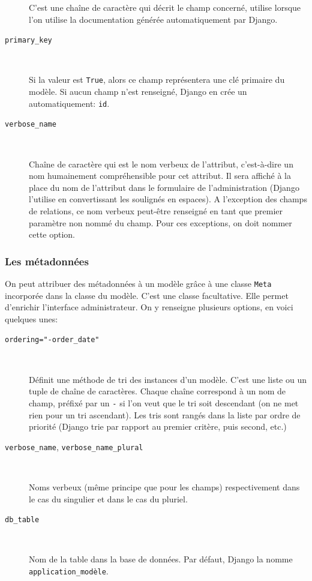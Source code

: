 \documentclass[a4paper, 10pt]{article}
\begin{document}
\begin{description}
          C'est une chaîne de caractère qui décrit le champ concerné, utilise lorsque l'on utilise la documentation générée automatiquement par Django.

    \item[\texttt{primary_key}]~

          Si la valeur est \texttt{True}, alors ce champ représentera une clé primaire du modèle. Si aucun champ n'est renseigné, Django en crée un automatiquement: \texttt{id}.

    \item[\texttt{verbose_name}]~

          Chaîne de caractère qui est le \og nom verbeux \fg{} de l'attribut, c'est-à-dire un nom humainement compréhensible pour cet attribut. Il sera affiché à la place du nom de l'attribut dans le formulaire de l'administration (Django l'utilise en convertissant les soulignés en espaces). A l'exception des champs de relations, ce nom verbeux peut-être renseigné en tant que premier paramètre non nommé du champ. Pour ces exceptions, on doit nommer cette option.
\end{description}

\subsubsection{Les métadonnées}
On  peut attribuer des métadonnées à un modèle grâce à une classe \texttt{Meta} incorporée dans la classe du modèle. C'est une classe facultative. Elle permet d'enrichir l'interface administrateur. On y renseigne plusieurs options, en voici quelques unes:
\begin{description}
    \item[\texttt{ordering="-order_date"}]~

          Définit une méthode de tri des instances d'un modèle. C'est une liste ou un tuple de chaîne de caractères. Chaque chaîne correspond à un nom de champ, préfixé par un \texttt{-} si l'on veut que le tri soit descendant (on ne met rien pour un tri ascendant). Les tris sont rangés dans la liste par ordre de priorité (Django trie par rapport au premier critère, puis second, etc.)

    \item[\texttt{verbose_name}, \texttt{verbose_name_plural}]~

          Noms verbeux (même principe que pour les champs) respectivement dans le cas du singulier et dans le cas du pluriel.

    \item[\texttt{db_table}]~

          Nom de la table dans la base de données. Par défaut, Django la nomme \texttt{application\_modèle}.
\end{description}
\end{document}
